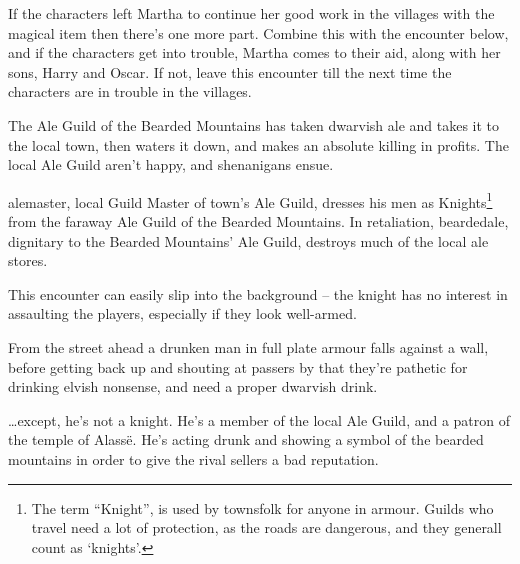 \begin{multicols}{2}

If the characters left Martha to continue her good work in the villages with the magical item then there's one more part.
Combine this with the encounter below, and if the characters get into trouble, Martha comes to their aid, along with her sons, Harry and Oscar.
If not, leave this encounter till the next time the characters are in trouble in the villages.


\humansoldier

\stopcontents[sq]


\startcontents[sq]


The Ale Guild of the Bearded Mountains has taken dwarvish ale and takes it to the local town, then waters it down, and makes an absolute killing in profits.
The local Ale Guild aren't happy, and shenanigans ensue.

\Gls{alemaster}, local Guild Master of town's Ale Guild, dresses his men as Knights\footnote{The term ``Knight'', is used by townsfolk for anyone in armour.  Guilds who travel need a lot of protection, as the roads are dangerous, and they generall count as `knights'.} from the faraway Ale Guild of the Bearded Mountains.  In retaliation, \gls{beardedale}, dignitary to the Bearded Mountains' Ale Guild, destroys much of the local ale stores.


This encounter can easily slip into the background -- the knight has no interest in assaulting the players, especially if they look well-armed.

\begin{boxtext}

	From the street ahead a drunken man in full plate armour falls against a wall, before getting back up and shouting at passers by that they're pathetic for drinking elvish nonsense, and need a proper dwarvish drink.

\end{boxtext}

\ldots except, he's not a knight.
He's a member of the local Ale Guild, and a patron of the temple of Alass\"{e}.
He's acting drunk and showing a symbol of the bearded mountains in order to give the rival sellers a bad reputation.


\end{multicols}

